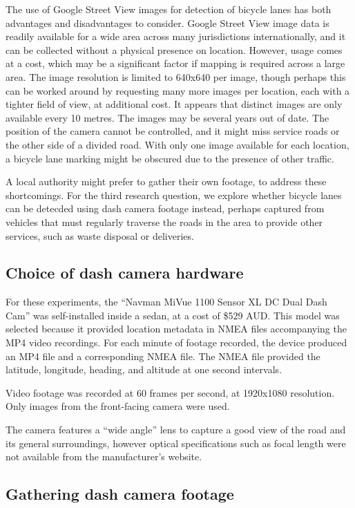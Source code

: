 \documentclass[11pt,twoside]{report}
\begin{document}
The use of Google Street View images for detection of bicycle lanes has both advantages and disadvantages to consider.  Google Street View image data is readily available for a wide area across many jurisdictions internationally, and it can be collected without a physical presence on location.  However, usage comes at a cost, which may be a significant factor if mapping is required across a large area.  The image resolution is limited to 640x640 per image, though perhaps this can be worked around by requesting many more images per location, each with a tighter field of view, at additional cost.  It appears that distinct images are only available every 10 metres.  The images may be several years out of date.  The position of the camera cannot be controlled, and it might miss service roads or the other side of a divided road.  With only one image available for each location, a bicycle lane marking might be obscured due to the presence of other traffic.

A local authority might prefer to gather their own footage, to address these shortcomings.  For the third research question, we explore whether bicycle lanes can be detecded using dash camera footage instead, perhaps captured from vehicles that must regularly traverse the roads in the area to provide other services, such as waste disposal or deliveries.


\subsection{Choice of dash camera hardware}
\label{s:rq3a}

For these experiments, the ``Navman MiVue 1100 Sensor XL DC Dual Dash Cam'' was self-installed inside a sedan, at a cost of \$529 AUD.  This model was selected because it provided location metadata in NMEA files accompanying the MP4 video recordings.  For each minute of footage recorded, the device produced an MP4 file and a corresponding NMEA file.  The NMEA file provided the latitude, longitude, heading, and altitude at one second intervals.

Video footage was recorded at 60 frames per second, at 1920x1080 resolution.  Only images from the front-facing camera were used.

The camera features a ``wide angle'' lens to capture a good view of the road and its general surroundings, however optical specifications such as focal length were not available from the manufacturer's website.


\subsection{Gathering dash camera footage}
\label{s:rq3b}
\end{document}
